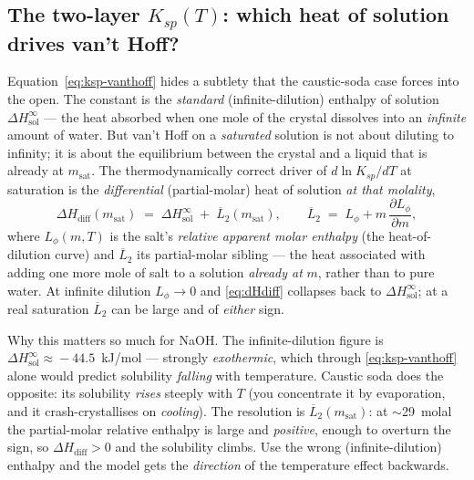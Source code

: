 \documentclass[11pt,a4paper]{article}
\begin{document}
\subsection{The two-layer $K_{sp}(T)$: which heat of solution drives
van't Hoff?}\label{sec:ksp-two-layer}

Equation~\eqref{eq:ksp-vanthoff} hides a subtlety that the caustic-soda
case forces into the open.  The constant  is the
\emph{standard} (infinite-dilution) enthalpy of solution
$\Delta H_{\text{sol}}^{\infty}$ --- the heat absorbed when one mole of the
crystal dissolves into an \emph{infinite} amount of water.  But van't Hoff
on a \emph{saturated} solution is not about diluting to infinity; it is
about the equilibrium between the crystal and a liquid that is already at
$m_{\text{sat}}$.  The thermodynamically correct driver of
$d\ln K_{sp}/dT$ at saturation is the \emph{differential} (partial-molar)
heat of solution \emph{at that molality},
\begin{equation}
   \Delta H_{\text{diff}}(m_{\text{sat}})
   \;=\; \Delta H_{\text{sol}}^{\infty} \;+\; \overline{L}_2(m_{\text{sat}}),
   \qquad
   \overline{L}_2 \;=\; L_\phi + m\,\frac{\partial L_\phi}{\partial m},
   \label{eq:dHdiff}
\end{equation}
where $L_\phi(m,T)$ is the salt's \emph{relative apparent molar enthalpy}
(the heat-of-dilution curve) and $\overline{L}_2$ its partial-molar
sibling --- the heat associated with adding one more mole of salt to a
solution \emph{already at} $m$, rather than to pure water.  At infinite
dilution $L_\phi\to0$ and \eqref{eq:dHdiff} collapses back to
$\Delta H_{\text{sol}}^{\infty}$; at a real saturation $\overline{L}_2$ can
be large and of \emph{either} sign.

\begin{intuition}
Why this matters so much for NaOH.  The infinite-dilution figure is
$\Delta H_{\text{sol}}^{\infty}\!\approx\!-44.5$~kJ/mol --- strongly
\emph{exothermic}, which through \eqref{eq:ksp-vanthoff} alone would
predict solubility \emph{falling} with temperature.  Caustic soda does the
opposite: its solubility \emph{rises} steeply with $T$ (you concentrate it
by evaporation, and it crash-crystallises on \emph{cooling}).  The
resolution is $\overline{L}_2(m_{\text{sat}})$: at $\sim$29~molal the
partial-molar relative enthalpy is large and \emph{positive}, enough to
overturn the sign, so $\Delta H_{\text{diff}}>0$ and the solubility climbs.
Use the wrong (infinite-dilution) enthalpy and the model gets the
\emph{direction} of the temperature effect backwards.
\end{intuition}
\end{document}
